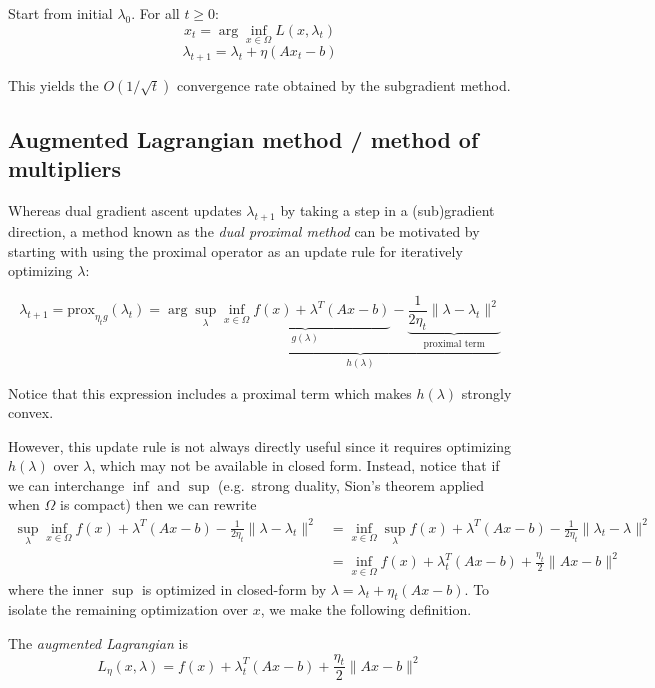 Start from initial $\lambda_0$.
For all $t \geq 0$:
\[
x_t = \arg\inf_{x \in \Omega} L(x, \lambda_t)
\]
\[
\lambda_{t+1} = \lambda_t + \eta (A x_t - b)
\]

This yields the $O(1/\sqrt{t})$ convergence rate obtained by the
subgradient method.

\subsection{Augmented Lagrangian method / method of multipliers}

Whereas dual gradient ascent updates $\lambda_{t+1}$ by taking a step
in a (sub)gradient direction, a method known as the \emph{dual proximal
method} can be motivated by starting with using the proximal operator \cite{parikh2014proximal}
as an update rule for iteratively optimizing $\lambda$:

\[
\lambda_{t+1}
= \mathrm{prox}_{\eta_t g}(\lambda_t)
 = \arg\sup_{\lambda} \underbrace{\underbrace{\inf_{x \in \Omega} f(x) + \lambda^T (A x - b)}_{g(\lambda)} - \underbrace{\frac{1}{2 \eta_t} \|\lambda - \lambda_t\|^2}_{\text{proximal term}}}_{h(\lambda)}
\]

Notice that this expression includes a proximal term which makes
$h(\lambda)$ strongly convex.

However, this update rule is not always directly useful since it requires
optimizing $h(\lambda)$ over $\lambda$, which may not be available
in closed form. Instead, notice that if we can interchange $\inf$ and
$\sup$ (e.g.~strong duality, Sion's theorem applied when $\Omega$ is
compact) then we can rewrite
\begin{align}
\sup_{\lambda} \inf_{x \in \Omega} f(x) + \lambda^T(A x - b) - \frac{1}{2 \eta_t} \|\lambda - \lambda_t\|^2 &= \inf_{x \in \Omega} \sup_\lambda f(x) + \lambda^T(A x - b) - \frac{1}{2\eta_t} \|\lambda_t - \lambda\|^2 \\
&= \inf_{x \in \Omega} f(x) + \lambda_t^T (A x - b) + \frac{\eta_t}{2}\|A x - b\|^2
\end{align}
where the inner $\sup$ is optimized in closed-form by
$\lambda = \lambda_t + \eta_t(A x - b)$. To isolate the remaining
optimization over $x$, we make the following definition.

\begin{definition}
The \emph{augmented Lagrangian} is
\[L_\eta(x,\lambda) = f(x) + \lambda_t^T (A x - b) + \frac{\eta_t}{2}\|A x - b\|^2\]
\end{definition}

